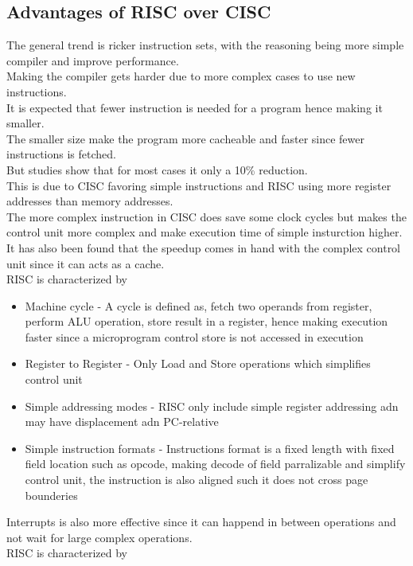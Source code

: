 \documentclass[12pt, a4paper]{article}
\begin{document}
		\subsection{Advantages of RISC over CISC}
			The general trend is ricker instruction sets, with the reasoning being more simple compiler and improve performance.\\
			Making the compiler gets harder due to more complex cases to use new instructions.\\
			It is expected that fewer instruction is needed for a program hence making it smaller.\\
			The smaller size make the program more cacheable and faster since fewer instructions is fetched.\\
			But studies show that for most cases it only a 10\% reduction.\\
			This is due to CISC favoring simple instructions and RISC using more register addresses than memory addresses.\\
			The more complex instruction in CISC does save some clock cycles but makes the control unit more complex and make execution time of simple insturction higher.\\
			It has also been found that the speedup comes in hand with the complex control unit since it can acts as a cache.\\
			RISC is characterized by
			\begin{itemize}
				\item Machine cycle - A cycle is defined as, fetch two operands from register, perform ALU operation, store result in a register, hence making execution faster since a microprogram control store is not accessed in execution
				\item Register to Register - Only Load and Store operations which simplifies control unit
				\item Simple addressing modes - RISC only include simple register addressing adn may have displacement adn PC-relative
				\item Simple instruction formats - Instructions format is a fixed length with fixed field location such as opcode, making decode of field parralizable and simplify control unit, the instruction is also aligned such it does not cross page bounderies
			\end{itemize}
			Interrupts is also more effective since it can happend in between operations and not wait for large complex operations.\\
			RISC is characterized by
\end{document}
